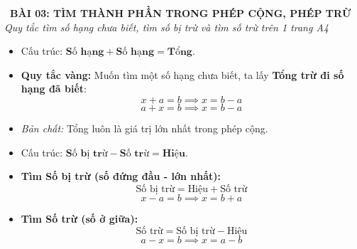 \documentclass[12pt,a4paper]{article}
\begin{document}
\begin{tcolorbox}[
  enhanced,
  colback=teal!8!white,
  colframe=teal!70!black,
  arc=3mm, boxrule=1.2pt,
  left=3mm, right=3mm, top=2mm, bottom=2mm,
  halign=center
]
  {\LARGE\bfseries\color{teal!90!black}\faBookmark\ BÀI 03: TÌM THÀNH PHẦN TRONG PHÉP CỘNG, PHÉP TRỪ}\\[1mm]
  {\itshape\footnotesize\color{black!75} Quy tắc tìm số hạng chưa biết, tìm số bị trừ và tìm số trừ trên 1 trang A4}
\end{tcolorbox}

\vspace{-2mm}

\noindent
\begin{minipage}[t]{0.49\textwidth}\vspace{0pt}
\begin{tcolorbox}[
  enhanced,
  colback=blue!4!white,
  colframe=blue!75!black,
  arc=2mm, boxrule=0.8pt,
  left=2mm, right=2mm, top=1.8mm, bottom=1.8mm,
  title={\footnotesize\bfseries\color{white}\faKey\ 1. Tìm Số hạng chưa biết}
]
{\footnotesize
\begin{itemize}\setlength{\itemsep}{1pt}\setlength{\leftskip}{-2.5mm}
  \item Cấu trúc: $\mathbf{\text{Số hạng}} + \mathbf{\text{Số hạng}} = \mathbf{\text{Tổng}}$.
  \item \textbf{Quy tắc vàng:} Muốn tìm một số hạng chưa biết, ta lấy \textbf{Tổng trừ đi số hạng đã biết}:
  $$x + a = b \implies x = b - a$$
  $$a + x = b \implies x = b - a$$
  \item \textit{Bản chất:} Tổng luôn là giá trị lớn nhất trong phép cộng.
\end{itemize}
}
\end{tcolorbox}
\end{minipage}
\hfill
\begin{minipage}[t]{0.49\textwidth}\vspace{0pt}
\begin{tcolorbox}[
  enhanced,
  colback=teal!4!white,
  colframe=teal!75!black,
  arc=2mm, boxrule=0.8pt,
  left=2mm, right=2mm, top=1.8mm, bottom=1.8mm,
  title={\footnotesize\bfseries\color{white}\faSliders\ 2. Tìm Số bị trừ \& Số trừ}
]
{\footnotesize
\begin{itemize}\setlength{\itemsep}{1pt}\setlength{\leftskip}{-2.5mm}
  \item Cấu trúc: $\mathbf{\text{Số bị trừ}} - \mathbf{\text{Số trừ}} = \mathbf{\text{Hiệu}}$.
  \item \textbf{Tìm Số bị trừ (số đứng đầu - lớn nhất):}
  $$\text{Số bị trừ} = \text{Hiệu} + \text{Số trừ}$$
  $$x - a = b \implies x = b + a$$
  \item \textbf{Tìm Số trừ (số ở giữa):}
  $$\text{Số trừ} = \text{Số bị trừ} - \text{Hiệu}$$
  $$a - x = b \implies x = a - b$$
\end{itemize}
}
\end{tcolorbox}
\end{minipage}
\end{document}

